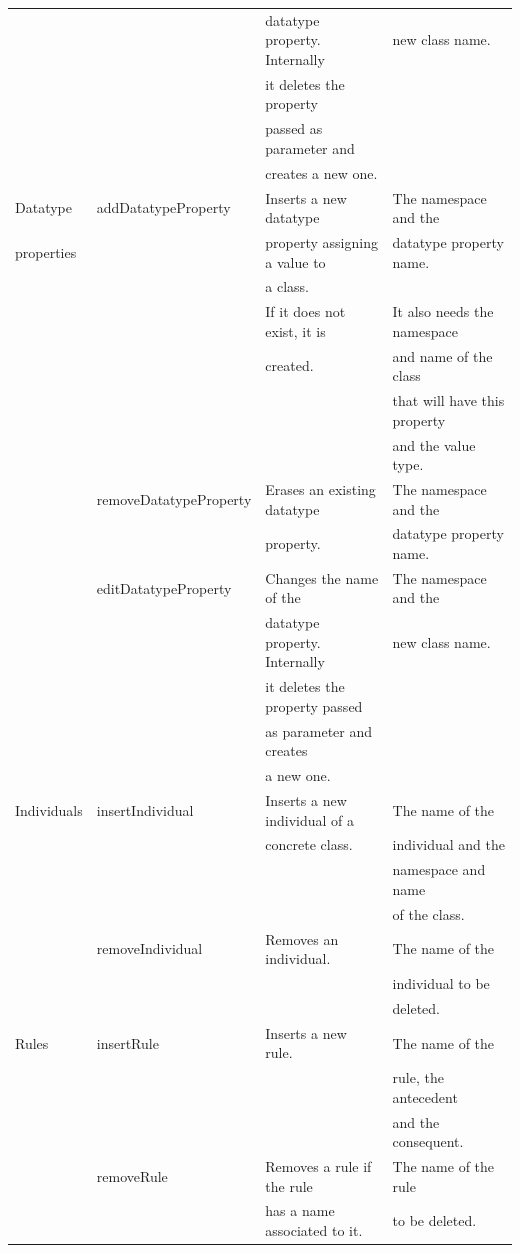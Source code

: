 \begin{center}
\begin{longtable}{l l l l}
			&			& datatype property. Internally & new class name.	\\
			&			& it deletes the property 	& 			\\
			&			& passed as parameter and 	&			\\
			& 			& creates a new one.		& 			\\
  \hline 
  Datatype 		& addDatatypeProperty	& Inserts a new datatype 	& The namespace and the \\
  properties		&			& property assigning a value to & datatype property name.\\
			& 			& a class.			& 			\\
			&			& If it does not exist, it is	& It also needs the namespace 	\\
			&			& created.			& and name of the class \\
			& 			& 				& that will have this property 	\\
			& 			& 				& and the value type.	\\
			& removeDatatypeProperty& Erases an existing datatype	& The namespace and the \\
			& 			& property.			& datatype property name.\\
			& editDatatypeProperty	& Changes the name of the 	& The namespace and the \\
			&			& datatype property. Internally & new class name.	\\
			&			& it deletes the property passed& 			\\
			&			& as parameter and creates 	&			\\
			& 			& a new one.			& 			\\
  \hline 
  Individuals 		& insertIndividual	& Inserts a new individual of a & The name of the 	\\
			&			& concrete class.		& individual and the 	\\
			& 			& 				& namespace and name 	\\
			& 			& 				& of the class.		\\
			& removeIndividual 	& Removes an individual.	& The name of the 	\\
			&			&				& individual to be 	\\
			& 			& 				& deleted.		\\
  \hline 
  Rules 		& insertRule		& Inserts a new rule.		& The name of the 	\\
			&			& 				& rule, the antecedent 	\\
			& 			& 				& and the consequent.	\\
			& removeRule 		& Removes a rule if the rule 	& The name of the rule 	\\
			&			& has a name associated to it.	& to be deleted.	\\
  \hline
\end{longtable}

\end{center}


